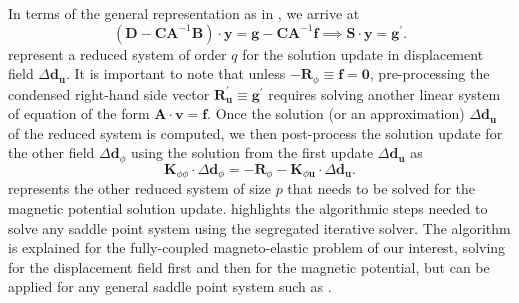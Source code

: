 In terms of the general representation as in , we arrive at
\begin{equation}
\left( \mathbf{D} - \mathbf{C} \mathbf{A}^{-1} \mathbf{B} \right) \cdot \mathbf{y} = \mathbf{g} - \mathbf{C} \mathbf{A}^{-1} \mathbf{f} \implies \mathbf{S} \cdot \mathbf{y} = \mathbf{g}^'.
\label{eq:3.20} 
\end{equation}
 represent a reduced system of order $q$ for the solution update in displacement field $\Delta \mathbf{d}_{\mathbf{u}}$. It is important to note that unless $-\mathbf{R}_{\phi} \equiv \mathbf{f} = \mathbf{0}$, pre-processing the condensed right-hand side vector $\mathbf{R}_{\mathbf{u}}^' \equiv \mathbf{g}^'$ requires solving another linear system of equation of the form $\mathbf{A} \cdot \mathbf{v} = \mathbf{f}$. Once the solution (or an approximation) $\Delta \mathbf{d}_{\mathbf{u}}$ of the reduced system  is computed, we then post-process the solution update for the other field $\Delta \mathbf{d}_{\phi}$ using the solution from the first update $\Delta \mathbf{d}_{\mathbf{u}}$ as
\begin{equation}
\mathbf{K}_{\phi \phi} \cdot \Delta \mathbf{d}_{\phi} = -\mathbf{R}_{\phi} - \mathbf{K}_{\phi \mathbf{u}} \cdot \Delta \mathbf{d}_{\mathbf{u}}.
\label{eq:3.21}
\end{equation}
 represents the other reduced system of size $p$ that needs to be solved for the magnetic potential solution update.  highlights the algorithmic steps needed to solve any saddle point system using the segregated iterative solver. The algorithm is explained for the fully-coupled magneto-elastic problem of our interest, solving for the displacement field first and then for the magnetic potential, but can be applied for any general saddle point system such as . \newline \par 

